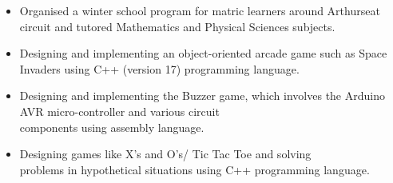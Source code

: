 \documentclass[10pt,a4paper,ragged2e]{altacv}
\begin{document}
\divider


\begin{itemize}
%

\item Organised a winter school program for matric learners around Arthurseat circuit and tutored Mathematics and Physical Sciences subjects.

\end{itemize}













\begin{itemize}
    \item Designing and implementing an object-oriented arcade game such as Space Invaders using C++ (version 17) programming language.
    \item Designing and implementing the Buzzer game, which involves the Arduino AVR micro-controller and various circuit\\ components using assembly language.
    \item Designing games like X’s and O’s/ Tic Tac Toe and solving \\ problems in hypothetical situations using C++ programming language.
\end{itemize}
\end{document}
